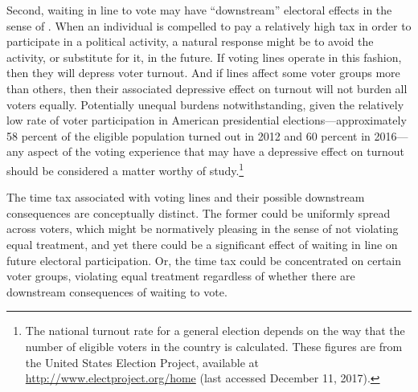 \documentclass[12pt,titlepage]{article}
\begin{document}
Second, waiting in line to vote may have ``downstream'' electoral
effects in the sense of
\citet{pettigrew:longlinesminorityprecincts}. When an individual is
compelled to pay a relatively high tax in order to participate in a
political activity, a natural response might be to avoid the activity,
or substitute for it, in the future. If voting lines operate in this
fashion, then they will depress voter turnout. And if lines affect
some voter groups more than others, then their associated depressive
effect on turnout will not burden all voters equally.  Potentially
unequal burdens notwithstanding, given the relatively low rate of
voter participation in American presidential elections---approximately
58 percent of the eligible population turned out in 2012 and 60
percent in 2016---any aspect of the voting experience that may have a
depressive effect on turnout should be considered a matter worthy of
study.\footnote{The national turnout rate for a general election
  depends on the way that the number of eligible voters in the country
  is calculated.  These figures are from the United States Election
  Project, available at \url{http://www.electproject.org/home} (last
  accessed December 11, 2017).\label{fn:uselectionproject}}



The time tax associated with voting lines and their possible
downstream consequences are conceptually distinct. The former could be
uniformly spread across voters, which might be normatively pleasing in
the sense of not violating equal treatment, and yet there could be a
significant effect of waiting in line on future electoral
participation. Or, the time tax could be concentrated on certain voter
groups, violating equal treatment regardless of whether there are
downstream consequences of waiting to vote.
\end{document}
